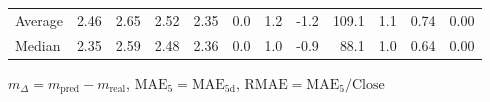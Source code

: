 \begin{threeparttable}
{\begin{tabular}{lrrrrrrrrrrr}
Average &          2.46 &          2.65 &          2.52 &        2.35 &                 0.0 &                 1.2 &       -1.2 &               109.1 &              1.1 &            0.74 &                   0.00 \\
 Median &          2.35 &          2.59 &          2.48 &        2.36 &                 0.0 &                 1.0 &       -0.9 &                88.1 &              1.0 &            0.64 &                   0.00 \\
\bottomrule
\end{tabular}
}
\begin{tablenotes}\footnotesize
\item $m_\Delta=m_{\text{pred}}-m_{\text{real}}$,
$\mathrm{MAE}_5=\mathrm{MAE}_{5\text{d}}$,
$\mathrm{RMAE}=\mathrm{MAE}_5/\text{Close}$
\end{tablenotes}
\end{threeparttable}
\endgroup

